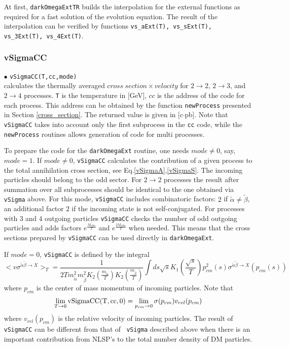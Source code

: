 \documentclass[12pt,a4paper]{article}
\begin{document}
At first, {\tt darkOmegaExtTR} builds the interpolation for  the external functions as required for a fast solution of the evolution equation. The result of the interpolation 
can be verified by functions {\tt vs\_aExt(T), vs\_sExt(T), vs\_3Ext(T), vs\_4Ext(T)}. 


\subsubsection{vSigmaCC}

\noindent
 $\bullet$    \verb|vSigmaCC(T,cc,mode)|\\
  calculates  the thermally  averaged  $cross\; section
\times velocity$ for $2\to2$, $2\to3$, and $2\to4$ processes. \verb|T| is the temperature in
[GeV],  $cc$ is the address of the code for each process. This address
can be obtained by the function {\tt newProcess} presented in  Section
\ref{cross_section}. The returned value  is given in [c$\cdot$pb].  Note that \verb|vSigmaCC| takes 
into account only the first subprocess in the {\tt cc} code, while the {\tt newProcess} routines allows generation of code for multi processes.

To prepare the code for the {\tt darkOmegaExt} routine, one needs $mode\ne0$, say, $mode=1$. If $mode\ne 0$, \verb|vSigmaCC|  calculates  the contribution of a given
process to the total annihilation cross section,  see Eq.\ref{vSigmaA},\ref{vSigmaS}. The
 incoming particles should belong to the odd sector.  For $2\to2$ processes the result after summation over all subprocesses  should
be identical to the one obtained via {\tt vSigma}  above. For this mode,
\verb|vSigmaCC|  includes combinatoric   factors: $2$ if $\tilde\alpha \ne
\tilde\beta$, an additional factor $2$ if the incoming state is not self-conjugated.
 For processes with 3 and 4 outgoing particles {\tt vSigmaCC} checks  the number of odd outgoing particles  and adds 
factors $e^{\frac{M_{cdm}}{T}} $ and  $e^{\frac{2M_{cdm}}{T}} $  when needed. This means that the cross sections prepared by 
{\tt vSigmaCC} can be used directly in {\tt darkOmegaExt}.   

If $mode=0$, {\tt vSigmaCC} is  defined by the integral
$$ <v \sigma^{\tilde\alpha\tilde\beta\to X}>_T=  \frac{1}{2 T
m_{\tilde\alpha}^2 m_{\tilde\beta}^2
K_2(\frac{m_{\tilde\alpha}}{T})K_2(\frac{m_{\tilde\beta}}{T})} \int ds \sqrt{s}
K_1(\frac{\sqrt{s}}{T})p_{cm}^2(s)\sigma^{\tilde\alpha\tilde\beta\to X}(p_{cm}(s))$$  
where $p_{cm}$ is the center of mass momentum of incoming particles.  Note that
$$\lim_{T\to 0} {\rm vSigmaCC(T,cc,0)}=\lim_{p_{cm}\to 0} \sigma(p_{cm}) v_{rel}(p_{cm}) $$ 
where   $v_{rel}(p_{cm})$ is the relative velocity of incoming particles.   The
result of {\tt vSigmaCC} can be different from that of {\tt
vSigma} described  above when there is an important contribution from NLSP's to the total
number density of DM particles. \\
\end{document}

